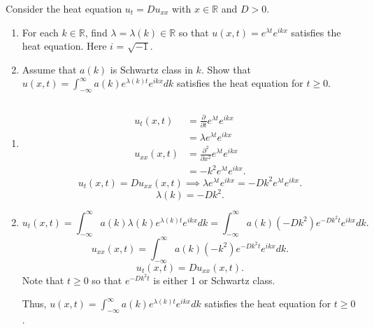 \documentclass[plain]{pset}
\begin{document}
\begin{problem}
Consider the heat equation \(u_t = Du_{xx}\) with \(x \in \mathbb{R}\) and \(D > 0\).
\begin{enumerate}[label = (\alph*)]
    \item For each \(k \in \mathbb{R}\), find \(\lambda = \lambda(k) \in \mathbb{R}\) so that \(u(x, t) = e^{\lambda t}e^{ikx}\) satisfies the heat equation. Here \(i\) = \(\sqrt{-1}\).
    \item Assume that \(a(k)\) is Schwartz class in \(k\). Show that \(u(x, t) = \int_{-\infty}^{\infty} a(k)e^{\lambda(k)t}e^{ikx}dk\) satisfies the heat equation for \(t \geq 0\).
\end{enumerate}
\end{problem}
\begin{solution}
    \[\]
    \vspace*{-4em}
    \begin{enumerate}[label = (\alph*)]
        \item \begin{align*}
                  u_t(x, t)    & = \frac{\partial}{\partial t}e^{\lambda t}e^{ikx}     \\
                               & = \lambda e^{\lambda t}e^{ikx}                        \\
                  u_{xx}(x, t) & = \frac{\partial^2}{\partial x^2}e^{\lambda t}e^{ikx} \\
                               & = -k^2e^{\lambda t}e^{ikx}.
              \end{align*}
              \[u_t(x, t) = Du_{xx}(x, t) \implies \lambda e^{\lambda t}e^{ikx} = -Dk^2e^{\lambda t}e^{ikx}.\]
              \[\lambda(k) = -Dk^2.\]
        \item \[u_t(x, t) = \int_{-\infty}^{\infty} a(k)\lambda(k)e^{\lambda(k)t}e^{ikx}dk = \int_{-\infty}^{\infty} a(k)(-Dk^2)e^{-Dk^2t}e^{ikx}dk.\]
              \[u_{xx}(x, t) = \int_{-\infty}^{\infty} a(k)(-k^2)e^{-Dk^2t}e^{ikx}dk.\]
              \[u_t(x, t) = Du_{xx}(x, t).\]
              Note that \(t \geq 0\) so that \(e^{-Dk^2t}\) is either 1 or Schwartz class.

              Thus, \(u(x, t) = \int_{-\infty}^{\infty} a(k)e^{\lambda(k)t}e^{ikx}dk\) satisfies the heat equation for \(t \geq 0\).
    \end{enumerate}
\end{solution}

\pagebreak
\end{document}
